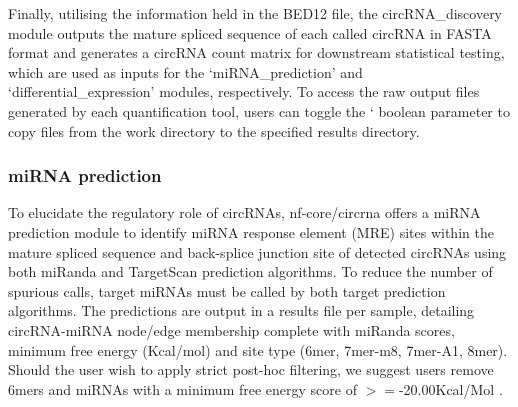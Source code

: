 \par
Finally, utilising the information held in the BED12 file, the circRNA\_discovery module outputs the mature spliced sequence of each called circRNA in FASTA format and generates a circRNA count matrix for downstream statistical testing, which are used as inputs for the `miRNA\_prediction' and `differential\_expression' modules, respectively. To access the raw output files generated by each quantification tool, users can toggle the ` boolean parameter to copy files from the work directory to the specified results directory.
\par

\subsubsection{miRNA prediction}
To elucidate the regulatory role of circRNAs, nf-core/circrna offers a miRNA prediction module to identify miRNA response element (MRE) sites within the mature spliced sequence and back-splice junction site of detected circRNAs using both miRanda \cite{miranda} and TargetScan \cite{Targetscan} prediction algorithms. To reduce the number of spurious calls, target miRNAs must be called by both target prediction algorithms. The predictions are output in a results file per sample, detailing circRNA-miRNA node/edge membership complete with miRanda scores, minimum free energy (Kcal/mol) and site type (6mer, 7mer-m8, 7mer-A1, 8mer). Should the user wish to apply strict post-hoc filtering, we suggest users remove 6mers and miRNAs with a minimum free energy score of $>=$-20.00Kcal/Mol \cite{Clark2018}.

